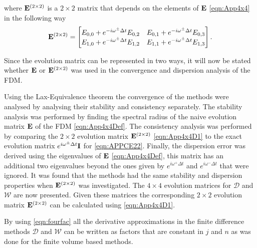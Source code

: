 where $\mathbf{E}^{\left(2 \times 2\right)}$ is a $2 \times 2$ matrix that depends on the elements of $\mathbf{E}$ \eqref{eqn:App4x4} in the following way
\begin{equation}
\label{eqn:App4x4D1}
\mathbf{E}^{\left(2 \times 2\right)} = \begin{bmatrix}E_{0,0} + e^{-i \omega^{\pm }\Delta t} E_{0,2} & E_{0,1} + e^{-i \omega^{\pm }\Delta t} E_{0,3} \\
E_{1,0} + e^{-i \omega^{\pm }\Delta t} E_{1,2} & E_{1,1} + e^{-i \omega^{\pm }\Delta t} E_{1,3} \\
\end{bmatrix}.
\end{equation}

Since the evolution matrix can be represented in two ways, it will now be stated whether $\mathbf{E}$ or $\mathbf{E}^{\left(2 \times 2\right)}$ was used in the convergence and dispersion analysis of the FDM. 

Using the Lax-Equivalence theorem the convergence of the methods were analysed by analysing their stability and consistency separately. The stability analysis was performed by finding the spectral radius of the naive evolution matrix $\mathbf{E}$ of the FDM \eqref{eqn:App4x4Def}. The consistency analysis was performed by comparing the $2\times2$ evolution matrix $\mathbf{E}^{\left(2 \times 2\right)}$ \eqref{eqn:App4x4D1} to the exact evolution matrix $e^{i \omega^\pm \Delta t}\mathbf{I} $ for \eqref{eqn:APPCE22}. Finally, the dispersion error was derived using the eigenvalues of $\mathbf{E}$ \eqref{eqn:App4x4Def}, this matrix has an additional two eigenvalues beyond the ones given by $e^{i \omega^+ \Delta t}$ and $e^{i \omega^- \Delta t}$ that were ignored. It was found that the methods had the same stability and dispersion properties when $\mathbf{E}^{\left(2 \times 2\right)}$ was investigated. The $4\times4$ evolution matrices for $\mathcal{D}$ and $\mathcal{W}$ are now presented. Given these matrices the corresponding $2\times 2$ evolution matrix $\mathbf{E}^{\left(2 \times 2\right)}$ can be calculated using \eqref{eqn:App4x4D1}.



By using \eqref{eqn:fourfac} all the derivative approximations in the finite difference methods $\mathcal{D}$ and $\mathcal{W}$ can be written as factors that are constant in $j$ and $n$ as was done for the finite volume based methods.

